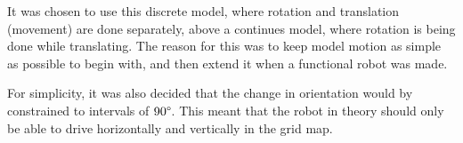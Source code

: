 \documentclass[Main]{subfiles}
\begin{document}
		It was chosen to use this discrete model, where rotation and translation (movement) are done separately, above a continues model, where rotation is being done while translating.
		The reason for this was to keep model motion as simple as possible to begin with, and then extend it when a functional robot was made.

		For simplicity, it was also decided that the change in orientation would by constrained to intervals of $90\degree$.
		This meant that the robot in theory should only be able to drive horizontally and vertically in the grid map.


\end{document}
